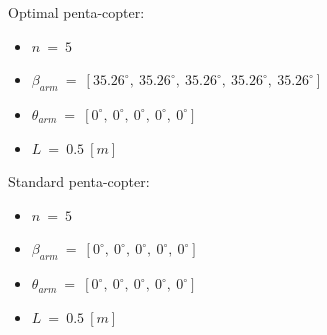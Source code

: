 {Optimal penta-copter:

\begin{itemize}
  \item $n\ =\ 5$
  \item $\beta_{arm}\ =\ [35.26^{\circ},\  35.26^{\circ},\  35.26^{\circ},\  35.26^{\circ},\   35.26^{\circ}]$
  \item $\theta_{arm}\ =\ [0^{\circ},\  0^{\circ},\  0^{\circ},\  0^{\circ},\  0^{\circ}]$
  \item $L\ =\ 0.5\ [m]$
\end{itemize}

Standard penta-copter:

\begin{itemize}
  \item $n\ =\ 5$
  \item $\beta_{arm}\ =\ [0^{\circ},\  0^{\circ},\  0^{\circ},\  0^{\circ},\  0^{\circ}]$
  \item $\theta_{arm}\ =\ [0^{\circ},\  0^{\circ},\  0^{\circ},\  0^{\circ},\  0^{\circ}]$
  \item $L\ =\ 0.5\ [m]$
\end{itemize}

}
